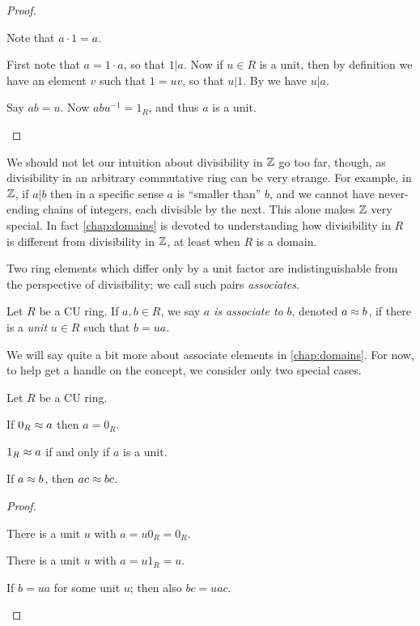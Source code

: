 \begin{proof}
\begin{inlineproplist}
\item Note that \(a \cdot 1 = a\).
\item First note that \(a = 1 \cdot a\), so that \(1|a\). Now if \(u \in R\) is a unit, then by definition we have an element \(v\) such that \(1 = uv\), so that \(u|1\). By  we have \(u|a\).
\item Say \(ab = u\). Now \(abu^{-1} = 1_R\), and thus \(a\) is a unit.
\end{inlineproplist}
\end{proof}

We should not let our intuition about divisibility in \(\mathbb{Z}\) go too far, though, as divisibility in an arbitrary commutative ring can be very strange. For example, in \(\mathbb{Z}\), if \(a|b\) then in a specific sense \(a\) is ``smaller than'' \(b\), and we cannot have never-ending chains of integers, each divisible by the next. This alone makes \(\mathbb{Z}\) very special. In fact \autoref{chap:domains} is devoted to understanding how divisibility in \(R\) is different from divisibility in \(\mathbb{Z}\), at least when \(R\) is a domain.

Two ring elements which differ only by a unit factor are indistinguishable from the perspective of divisibility; we call such pairs \emph{associates}.

\begin{dfn}[Associate] \label{dfn:associate}
Let \(R\) be a CU ring. If \(a,b \in R\), we say \(a\) \emph{is associate to} \(b\), denoted \(a \approx b\), if there is a \emph{unit} \(u \in R\) such that \(b = ua\). 
\end{dfn}

We will say quite a bit more about associate elements in \autoref{chap:domains}. For now, to help get a handle on the concept, we consider only two special cases.

\begin{prop}
Let \(R\) be a CU ring.
\begin{proplist*}
\item If \(0_R \approx a\) then \(a = 0_R\).
\item \(1_R \approx a\) if and only if \(a\) is a unit.
\item If \(a \approx b\), then \(ac \approx bc\).
\end{proplist*}
\end{prop}

\begin{proof}
\begin{inlineproplist}
\item There is a unit \(u\) with \(a = u0_R = 0_R\).
\item There is a unit \(u\) with \(a = u1_R = u\).
\item If \(b = ua\) for some unit \(u\); then also \(bc = uac\).
\end{inlineproplist}
\end{proof}

